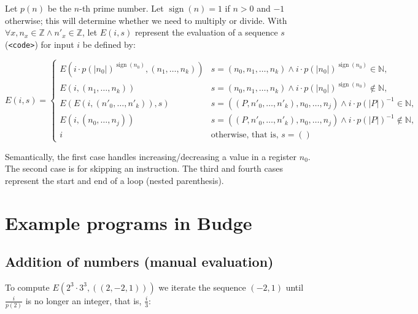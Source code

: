 \documentclass{article}
\DeclareMathOperator{\sign}{sign}
\begin{document}
Let $p(n)$ be the $n$-th prime number. Let $\sign(n) = 1$ if $n>0$ and $-1$ otherwise; this will determine whether we need to multiply or divide. With $\forall x, n_x \in \mathbb{Z} \land n'_x \in \mathbb{Z}$, let $E(i, s)$ represent the evaluation of a sequence $s$ (\texttt{<code>}) for input $i$ be defined by:

$$ E(i, s) = {
\begin{cases}
E(i \cdot p(|n_0|)^{\sign(n_0)}, (n_1, \ldots, n_k)) & s = (n_0, n_1, \ldots, n_k) \land i \cdot p(|n_0|)^{\sign(n_0)} \in \mathbb{N}, \\
E(i, (n_1, \ldots, n_k)) & s = (n_0, n_1, \ldots, n_k) \land i \cdot p(|n_0|)^{\sign(n_0)} \notin \mathbb{N}, \\
E(E(i, (n'_0, \ldots, n'_k)), s) & s = ((P, n'_0, \ldots, n'_k), n_0, \ldots, n_j) \land i \cdot p(|P|)^{-1} \in \mathbb{N}, \\
E(i, (n_0, \ldots, n_j)) & s = ((P, n'_0, \ldots, n'_k), n_0, \ldots, n_j) \land i \cdot p(|P|)^{-1} \notin \mathbb{N}, \\
i & {\text{otherwise, that is, } s = ()}\end{cases}} $$

Semantically, the first case handles increasing/decreasing a value in a register $n_0$. The second case is for skipping an instruction. The third and fourth cases represent the start and end of a loop (nested parenthesis).

\section{Example programs in Budge}

\subsection{Addition of numbers (manual evaluation)}

To compute $E(2^3 \cdot 3^3, ((2, -2, 1)))$ we iterate the sequence $(-2, 1)$ until $\frac{i}{p(2)}$ is no longer an integer, that is, $\frac{i}{3}$:
\end{document}
